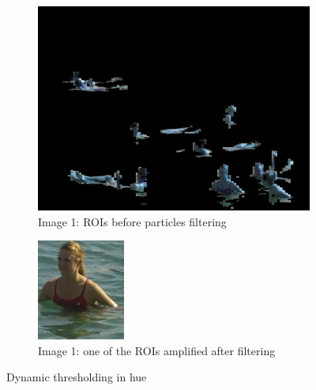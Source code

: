 \begin{figure}
        \centering
        \begin{subfigure}[b]{0.3\textwidth}
                \includegraphics[width=\textwidth]{Images/proc}
                \caption{Image 1: ROIs before particles filtering}
                \label{fig:ROIs}
        \end{subfigure}%
        \quad
        \begin{subfigure}[b]{0.3\textwidth}
                \includegraphics[width=\textwidth]{Images/ROI}
                \caption{Image 1: one of the ROIs amplified after filtering}
                \label{fig:oneROI}
        \end{subfigure}
        \caption{Dynamic thresholding in hue}
\end{figure}

